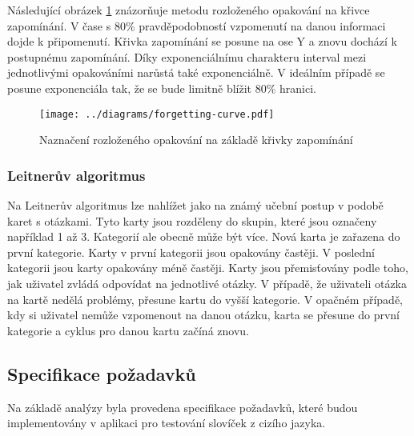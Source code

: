 \documentclass[a4paper,11pt,titlepage,fleqn]{article}
\begin{document}
            Následující obrázek \ref{fig:forgetting-curve} znázorňuje metodu rozloženého opakování na křivce zapomínání. V čase s 80\% pravděpodobností vzpomenutí na danou informaci dojde k připomenutí. Křivka zapomínání se posune na ose Y a znovu dochází k postupnému zapomínání. Díky exponenciálnímu charakteru interval mezi jednotlivými opakováními narůstá také exponenciálně. V ideálním případě se posune exponenciála tak, že se bude limitně blížit 80\% hranici.

            \begin{figure}[ht!]
                \centering
                \texttt{[image: ../diagrams/forgetting-curve.pdf]}
                \caption{Naznačení rozloženého opakování na základě křivky zapomínání}
                \label{fig:forgetting-curve}
            \end{figure}
         
        \subsubsection{Leitnerův algoritmus}
            \label{leitner}
            Na Leitnerův algoritmus lze nahlížet jako na známý učební postup v podobě karet s otázkami. Tyto karty jsou rozděleny do skupin, které jsou označeny například 1 až 3. Kategorií ale obecně může být více. Nová karta je zařazena do první kategorie. Karty v první kategorii jsou opakovány častěji. V poslední kategorii jsou karty opakovány méně častěji. Karty jsou přemisťovány podle toho, jak uživatel zvládá odpovídat na jednotlivé otázky. V případě, že uživateli otázka na kartě nedělá problémy, přesune kartu do vyšší kategorie. V opačném případě, kdy si uživatel nemůže vzpomenout na danou otázku, karta se přesune do první kategorie a cyklus pro danou kartu začíná znovu.

    \subsection{Specifikace požadavků}
        Na základě analýzy byla provedena specifikace požadavků, které budou implementovány v aplikaci pro testování slovíček z cizího jazyka.
\end{document}
